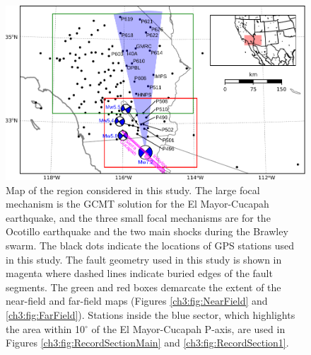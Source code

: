 \begin{figure}
\includegraphics[scale=1.0]{ch3/figures/2016jb013114-p01} 
\caption{Map of the region considered in this study.  The large focal mechanism is the GCMT solution for the El Mayor-Cucapah earthquake, and the three small focal mechanisms are for the Ocotillo earthquake and the two main shocks during the Brawley swarm.  The black dots indicate the locations of GPS stations used in this study.  The fault geometry used in this study is shown in magenta where dashed lines indicate buried edges of the fault segments.  The green and red boxes demarcate the extent of the near-field and far-field maps (Figures \ref{ch3:fig:NearField} and \ref{ch3:fig:FarField}).  Stations inside the blue sector, which highlights the area within 10$^\circ$ of the El Mayor-Cucapah P-axis, are used in Figures \ref{ch3:fig:RecordSectionMain} and \ref{ch3:fig:RecordSection1}.}       
\label{ch3:fig:ContextMap}
\end{figure}


